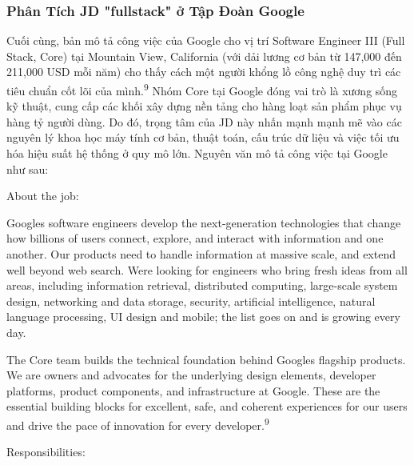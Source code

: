 \documentclass[12pt,a4paper]{article}
\begin{document}
\subsubsection{Phân Tích JD "fullstack" ở Tập Đoàn Google}

Cuối cùng, bản mô tả công việc của Google cho vị trí Software Engineer
III (Full Stack, Core) tại Mountain View, California (với dải lương cơ
bản từ 147,000 đến 211,000 USD mỗi năm) cho thấy cách một người khổng lồ
công nghệ duy trì các tiêu chuẩn cốt lõi của mình.\textsuperscript{9}
Nhóm Core tại Google đóng vai trò là xương sống kỹ thuật, cung cấp các
khối xây dựng nền tảng cho hàng loạt sản phẩm phục vụ hàng tỷ người
dùng. Do đó, trọng tâm của JD này nhấn mạnh mạnh mẽ vào các nguyên lý
khoa học máy tính cơ bản, thuật toán, cấu trúc dữ liệu và việc tối ưu
hóa hiệu suất hệ thống ở quy mô lớn. Nguyên văn mô tả công việc tại Google như sau:

About the job:

Google\textquotesingle s software engineers develop the next-generation
technologies that change how billions of users connect, explore, and
interact with information and one another. Our products need to handle
information at massive scale, and extend well beyond web search.
We\textquotesingle re looking for engineers who bring fresh ideas from
all areas, including information retrieval, distributed computing,
large-scale system design, networking and data storage, security,
artificial intelligence, natural language processing, UI design and
mobile; the list goes on and is growing every day.

The Core team builds the technical foundation behind
Google\textquotesingle s flagship products. We are owners and advocates
for the underlying design elements, developer platforms, product
components, and infrastructure at Google. These are the essential
building blocks for excellent, safe, and coherent experiences for our
users and drive the pace of innovation for every
developer.\textsuperscript{9}

Responsibilities:
\end{document}
